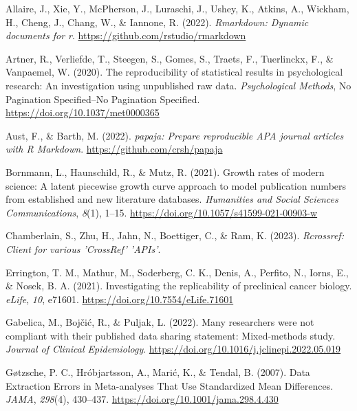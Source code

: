 \documentclass[
  ,man,floatsintext]{apa6}
\newlength{\cslhangindent}
\newlength{\cslentryspacingunit} %
\newenvironment{CSLReferences}[2] %
 {%
  \setlength{\parindent}{0pt}
  \ifodd #1
  \let\oldpar\par
  \def\par{\hangindent=\cslhangindent\oldpar}
  \fi
  \setlength{\parskip}{#2\cslentryspacingunit}
 }%
 {}
\begin{document}
\hypertarget{refs}{}
\begin{CSLReferences}{1}{0}
\leavevmode{}%
Allaire, J., Xie, Y., McPherson, J., Luraschi, J., Ushey, K., Atkins, A., Wickham, H., Cheng, J., Chang, W., \& Iannone, R. (2022). \emph{Rmarkdown: Dynamic documents for r}. \url{https://github.com/rstudio/rmarkdown}

\leavevmode{}%
Artner, R., Verliefde, T., Steegen, S., Gomes, S., Traets, F., Tuerlinckx, F., \& Vanpaemel, W. (2020). The reproducibility of statistical results in psychological research: {An} investigation using unpublished raw data. \emph{Psychological Methods}, No Pagination Specified--No Pagination Specified. \url{https://doi.org/10.1037/met0000365}

\leavevmode{}%
Aust, F., \& Barth, M. (2022). \emph{{papaja}: {Prepare} reproducible {APA} journal articles with {R Markdown}}. \url{https://github.com/crsh/papaja}

\leavevmode{}%
Bornmann, L., Haunschild, R., \& Mutz, R. (2021). Growth rates of modern science: A latent piecewise growth curve approach to model publication numbers from established and new literature databases. \emph{Humanities and Social Sciences Communications}, \emph{8}(1), 1--15. \url{https://doi.org/10.1057/s41599-021-00903-w}

\leavevmode{}%
Chamberlain, S., Zhu, H., Jahn, N., Boettiger, C., \& Ram, K. (2023). \emph{Rcrossref: Client for various 'CrossRef' 'APIs'}.

\leavevmode{}%
Errington, T. M., Mathur, M., Soderberg, C. K., Denis, A., Perfito, N., Iorns, E., \& Nosek, B. A. (2021). Investigating the replicability of preclinical cancer biology. \emph{eLife}, \emph{10}, e71601. \url{https://doi.org/10.7554/eLife.71601}

\leavevmode{}%
Gabelica, M., Bojčić, R., \& Puljak, L. (2022). Many researchers were not compliant with their published data sharing statement: Mixed-methods study. \emph{Journal of Clinical Epidemiology}. \url{https://doi.org/10.1016/j.jclinepi.2022.05.019}

\leavevmode{}%
Gøtzsche, P. C., Hróbjartsson, A., Marić, K., \& Tendal, B. (2007). Data {Extraction Errors} in {Meta-analyses That Use Standardized Mean Differences}. \emph{JAMA}, \emph{298}(4), 430--437. \url{https://doi.org/10.1001/jama.298.4.430}


\end{CSLReferences}
\end{document}
